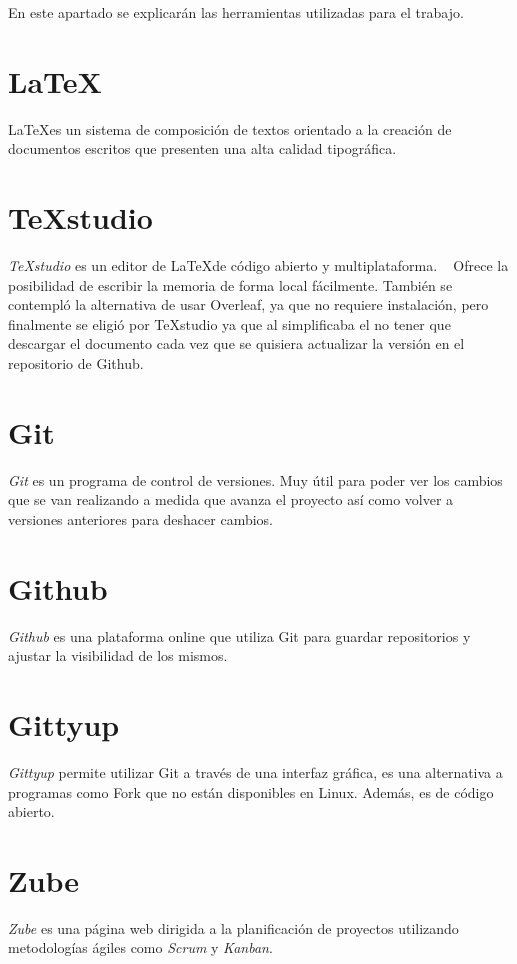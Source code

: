 
En este apartado se explicarán las herramientas utilizadas para el trabajo.

\section{\LaTeX}
\LaTeX es un sistema de composición de textos orientado a la creación de documentos escritos que presenten una alta calidad tipográfica. ~\cite{wiki:latex}

\section{TeXstudio}
\textit{TeXstudio} es un editor de \LaTeX de código abierto y multiplataforma. ~\cite{wiki:textudio} 
Ofrece la posibilidad de escribir la memoria de forma local fácilmente. También se contempló la alternativa de usar Overleaf, ya que no requiere instalación, pero finalmente se eligió por TeXstudio ya que al simplificaba el no tener que descargar el documento cada vez que se quisiera actualizar la versión en el repositorio de Github.

\section{Git}
\textit{Git} es un programa de control de versiones. 
Muy útil para poder ver los cambios que se van realizando a medida que avanza el proyecto así como volver a versiones anteriores para deshacer cambios.

\section{Github}
\textit{Github} es una plataforma online que utiliza Git para guardar repositorios y ajustar la visibilidad de los mismos. 

\section{Gittyup}
\textit{Gittyup} permite utilizar Git a través de una interfaz gráfica, es una alternativa a programas como Fork que no están disponibles en Linux. Además, es de código abierto.

\section{Zube}
\textit{Zube} es una página web dirigida a la planificación de proyectos utilizando metodologías ágiles como \textit{Scrum} y \textit{Kanban}.

